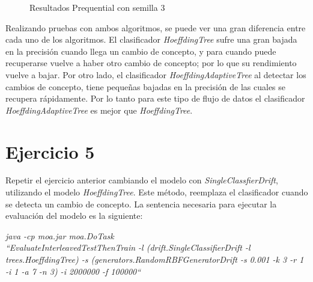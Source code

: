 \begin{figure}[H]
	\centering
	\caption{Resultados Prequential con semilla 3}
	\label{fig:res43}
\end{figure}
\vspace{0.06in}

Realizando pruebas con ambos algoritmos, se puede ver una gran diferencia
entre cada uno de los algoritmos. El clasificador \textit{HoeffdingTree} sufre una
gran bajada en la precisión cuando llega un cambio de concepto, y para
cuando puede recuperarse vuelve a haber otro cambio de concepto; por lo
que su rendimiento vuelve a bajar. Por otro lado, el clasificador
\textit{HoeffdingAdaptiveTree} al detectar los cambios de concepto, tiene pequeñas
bajadas en la precisión de las cuales se recupera rápidamente. Por lo tanto
para este tipo de flujo de datos el clasificador \textit{HoeffdingAdaptiveTree}
es mejor que \textit{HoeffdingTree}.

\section{Ejercicio 5}
Repetir el ejercicio anterior cambiando el modelo con \textit{SingleClassfierDrift},
utilizando el modelo \textit{HoeffdingTree}. Este método, reemplaza el clasificador
cuando se detecta un cambio de concepto. La sentencia necesaria para ejecutar
la evaluación del modelo es la siguiente:

\textit{java -cp moa.jar moa.DoTask \\ ``EvaluateInterleavedTestThenTrain -l
(drift.SingleClassifierDrift -l trees.HoeffdingTree) -s
(generators.RandomRBFGeneratorDrift -s 0.001 -k 3 -r 1 -i 1 -a 7 -n 3)
-i 2000000 -f 100000``}

